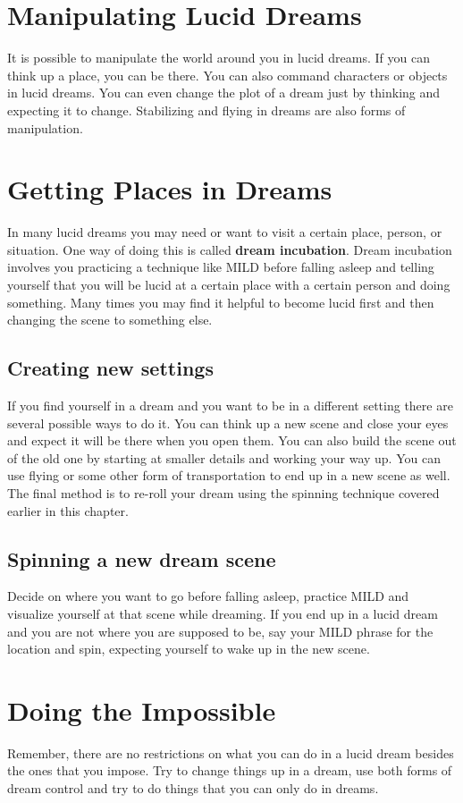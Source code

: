 \documentclass{book}
\begin{document}
\section{Manipulating Lucid Dreams}
It is possible to manipulate the world around you in lucid dreams. If you can think up a place, you can be there. You can also command characters or objects in lucid dreams. You can even change the plot of a dream just by thinking and expecting it to change. Stabilizing and flying in dreams are also forms of manipulation.

\section{Getting Places in Dreams}
In many lucid dreams you may need or want to visit a certain place, person, or situation. One way of doing this is called \textbf{dream incubation}. Dream incubation involves you practicing a technique like MILD before falling asleep and telling yourself that you will be lucid at a certain place with a certain person and doing something. Many times you may find it helpful to become lucid first and then changing the scene to something else.

\subsection{Creating new settings}
If you find yourself in a dream and you want to be in a different setting there are several possible ways to do it. You can think up a new scene and close your eyes and expect it will be there when you open them. You can also build the scene out of the old one by starting at smaller details and working your way up. You can use flying or some other form of transportation to end up in a new scene as well. The final method is to re-roll your dream using the spinning technique covered earlier in this chapter.

\subsection{Spinning a new dream scene}
Decide on where you want to go before falling asleep, practice MILD and visualize yourself at that scene while dreaming. If you end up in a lucid dream and you are not where you are supposed to be, say your MILD phrase for the location and spin, expecting yourself to wake up in the new scene.

\section{Doing the Impossible}
Remember, there are no restrictions on what you can do in a lucid dream besides the ones that you impose. Try to change things up in a dream, use both forms of dream control and try to do things that you can only do in dreams.
\end{document}
